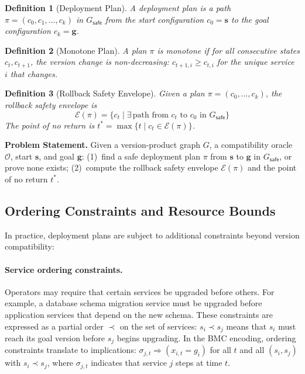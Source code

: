 \documentclass[10pt,twocolumn]{article}
\newtheorem{definition}{Definition}
\begin{document}
\begin{definition}[Deployment Plan]
A \emph{deployment plan} is a path $\pi = (c_0, c_1, \ldots, c_k)$
in $G_{\mathsf{safe}}$ from the start configuration $c_0 = \mathbf{s}$
to the goal configuration $c_k = \mathbf{g}$.
\end{definition}

\begin{definition}[Monotone Plan]
A plan $\pi$ is \emph{monotone} if for all consecutive states
$c_t, c_{t+1}$, the version change is non-decreasing:
$c_{t+1,i} \geq c_{t,i}$ for the unique service $i$ that changes.
\end{definition}

\begin{definition}[Rollback Safety Envelope]
\label{def:envelope}
Given a plan $\pi = (c_0, \ldots, c_k)$, the \emph{rollback
safety envelope} is
\[
  \mathcal{E}(\pi) = \{c_t \mid \exists\, \text{path from } c_t
  \text{ to } c_0 \text{ in } G_{\mathsf{safe}}\}
\]
The \emph{point of no return} is $t^{*} = \max\{t \mid c_t
\in \mathcal{E}(\pi)\}$.
\end{definition}

\noindent
\textbf{Problem Statement.}
Given a version-product graph $G$, a compatibility oracle
$\mathcal{O}$, start $\mathbf{s}$, and goal $\mathbf{g}$:
(1)~find a safe deployment plan $\pi$ from $\mathbf{s}$ to
$\mathbf{g}$ in $G_{\mathsf{safe}}$, or prove none exists;
(2)~compute the rollback safety envelope $\mathcal{E}(\pi)$ and
the point of no return $t^{*}$.

\subsection{Ordering Constraints and Resource Bounds}

In practice, deployment plans are subject to additional
constraints beyond version compatibility:

\paragraph{Service ordering constraints.}
Operators may require that certain services be upgraded before
others. For example, a database schema migration service must
be upgraded before application services that depend on the new
schema. These constraints are expressed as a partial order
$\prec$ on the set of services: $s_i \prec s_j$ means that
$s_i$ must reach its goal version before $s_j$ begins upgrading.
In the BMC encoding, ordering constraints translate to
implications: $\sigma_{j,t} \Rightarrow (x_{i,t} = g_i)$ for
all $t$ and all $(s_i, s_j)$ with $s_i \prec s_j$, where
$\sigma_{j,t}$ indicates that service $j$ steps at time $t$.
\end{document}
